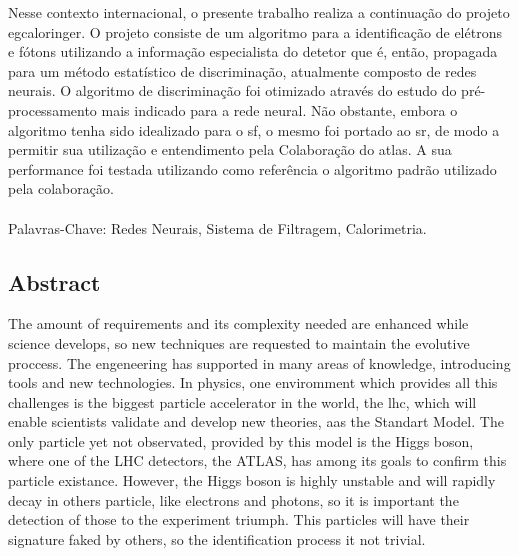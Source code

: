 Nesse contexto internacional, o presente trabalho realiza a continuação
do projeto \acrshort{egcaloringer}. O projeto consiste de um algoritmo 
para a identificação de elétrons e fótons utilizando a informação especialista 
do detetor que é, então, propagada para um método estatístico de discriminação, 
atualmente composto de redes neurais. O algoritmo de discriminação foi otimizado 
através do estudo do pré-processamento mais indicado para a rede neural. 
Não obstante, embora o algoritmo tenha sido idealizado para o \gls{sf}, 
o mesmo foi portado ao \gls{sr}, de modo a permitir sua utilização e 
entendimento pela Colaboração do \acrshort{atlas}. A sua performance foi 
testada utilizando como referência o algoritmo padrão utilizado 
pela colaboração.

\paragraph*{}

\noindent Palavras-Chave: Redes Neurais, Sistema de Filtragem, Calorimetria.

\vfill

\cleardoublepage

\vfill
\begin{center}
\section*{Abstract\label{Abstract}}
\end{center}

The amount of requirements and its complexity needed are enhanced while science
develops, so new techniques are requested to maintain the evolutive proccess.
The engeneering has supported in many areas of knowledge, introducing tools and
new technologies.
In physics, one enviromment which provides all this challenges is the biggest
particle accelerator in the world, the \acrshort{lhc}, which will enable
scientists validate and develop new theories, aas the Standart Model. The only
particle yet not observated, provided by this model is the Higgs boson, where
one of the LHC detectors, the ATLAS, has among its goals to confirm this
particle existance. However, the Higgs boson is highly unstable and will rapidly
decay in others particle, like electrons and photons, so it is important the
detection of those to the experiment triumph. This particles will have their
signature faked by others, so the identification process it not trivial.

